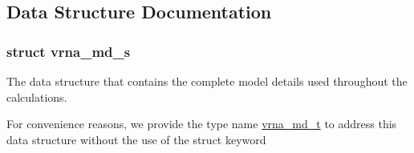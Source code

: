 \subsection{Data Structure Documentation}
\label{structvrna__md__s}
\subsubsection{struct vrna\+\_\+md\+\_\+s}
The data structure that contains the complete model details used throughout the calculations. 

For convenience reasons, we provide the type name \mbox{\hyperlink{group__model__details_ga1f8a10e12a0a1915f2a4eff0b28ea17c}{vrna\+\_\+md\+\_\+t}} to address this data structure without the use of the struct keyword

